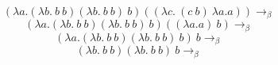 \documentclass{article}[14pt]
\begin{document}
$$(\lambda a. (\lambda b.\ b \ b) (\lambda b. \ b \ b) \ b) ((\lambda c. \ (c \ b) \ \lambda a.a)) \to_\beta $$
$$(\lambda a. (\lambda b.\ b \ b) (\lambda b. \ b \ b) \ b) ((\lambda a.a) \ b) \to_\beta$$
$$(\lambda a. (\lambda b.\ b \ b) (\lambda b. \ b \ b) \ b) \ b \to_\beta $$
$$(\lambda b.\ b \ b) (\lambda b. \ b \ b) \ b \to_\beta $$
\end{document}
